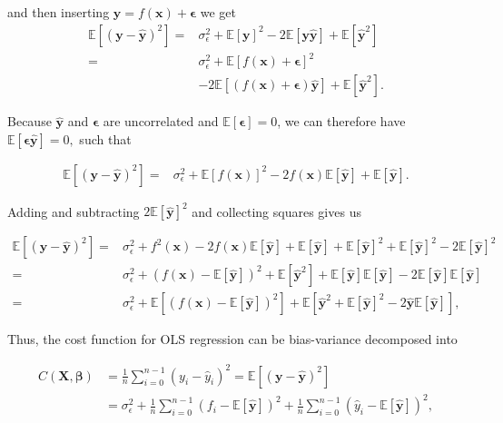 \documentclass[a4paper]{article}
\begin{document}
and then inserting $\mathbf{y} = f(\mathbf{x}) + \boldsymbol{\epsilon}$ we get
\begin{equation*}
    \begin{aligned}
    \mathbb{E}[	(\mathbf{y}-\mathbf{\hat{y}})^2]=& \sigma_{\epsilon}^2 +  \mathbb{E}[\mathbf{y}]^2 -2 \mathbb{E}[\mathbf{y}\mathbf{\hat{y}}] +  \mathbb{E}[\mathbf{\hat{y}}^2]\\
    =& \sigma_{\epsilon}^2 +  \mathbb{E}[f(\mathbf{x}) + \boldsymbol{\epsilon}]^2 \\&- 2 \mathbb{E} [(f(\mathbf{x})+\boldsymbol{\epsilon})\mathbf{\hat{y}}] +  \mathbb{E}[\mathbf{\hat{y}}^2 ].
    \end{aligned}
    \label{auto4}
\end{equation*}

Because $\mathbf{\hat{y}}$ and $\boldsymbol{\epsilon}$ are uncorrelated and $\mathbb{E}[\boldsymbol{\epsilon}]=0$, we can therefore have $\mathbb{E}[\boldsymbol{\epsilon}\mathbf{\hat{y}}]=0,$ such that

\begin{align*}
    \mathbb{E}[	(\mathbf{y}-\mathbf{\hat{y}})^2]=& \sigma_{\epsilon}^2 +  \mathbb{E}[f(\mathbf{x})]^2 -2f(\mathbf{x}) \mathbb{E}[\mathbf{\hat{y}}] +  \mathbb{E}[\mathbf{\hat{y}}].
\end{align*}

Adding and subtracting $2\mathbb{E}[\mathbf{\hat{y}}]^2$ and collecting squares gives us

\begin{align*}
    \mathbb{E}[(\mathbf{y}-\mathbf{\hat{y}})^2]
    =&\sigma_{\epsilon}^2 + f^2(\mathbf{x})-2f(\mathbf{x})\mathbb{E}[\mathbf{\hat{y}}] +\mathbb{E}[\mathbf{\hat{y}}]+\mathbb{E}[\mathbf{\hat{y}}]^2 
    +\mathbb{E}[\mathbf{\hat{y}}]^2 - 2\mathbb{E}[\mathbf{\hat{y}}]^2\\
    =&\sigma_{\epsilon}^2 + (f(\mathbf{x}) -\mathbb{E}[\mathbf{\hat{y}}])^2 +\mathbb{E}[\mathbf{\hat{y}}^2] +\mathbb{E}[\mathbf{\hat{y}}]\mathbb{E}[\mathbf{\hat{y}}]
    -2\mathbb{E}[\mathbf{\hat{y}}]\mathbb{E}[\mathbf{\hat{y}}]\\
    =&\sigma_{\epsilon}^2 +\mathbb{E}[( f(\mathbf{x}) - \mathbb{E}[\mathbf{\hat{y}}])^2] +\mathbb{E}[\mathbf{\hat{y}}^2 + \mathbb{E}[\mathbf{\hat{y}}]^2 
    -2\mathbf{\hat{y}}\mathbb{E}[\mathbf{\hat{y}}]],
\end{align*}

Thus, the cost function for OLS regression can be bias-variance decomposed into

\begin{equation}
    \begin{aligned}
    C(\mathbf{X},\boldsymbol{\beta}) 
    &= \frac{1}{n}\sum_{i=0}^{n-1}(y_i-\hat{y}_i)^2 = \mathbb{E}[(\mathbf{y}-\mathbf{\hat{y}})^2]\\
    &= \sigma_{\epsilon}^2 + \frac{1}{n}\sum_{i=0}^{n-1}(f_i-\mathbb{E}\left[\mathbf{\hat{y}}\right])^2 + \frac{1}{n}\sum_{i=0}^{n-1}(\hat{y}_i-\mathbb{E}\left[\mathbf{\hat{y}}\right])^2,\\
    \end{aligned}
    \label{biasvariances} 
\end{equation}
\end{document}

